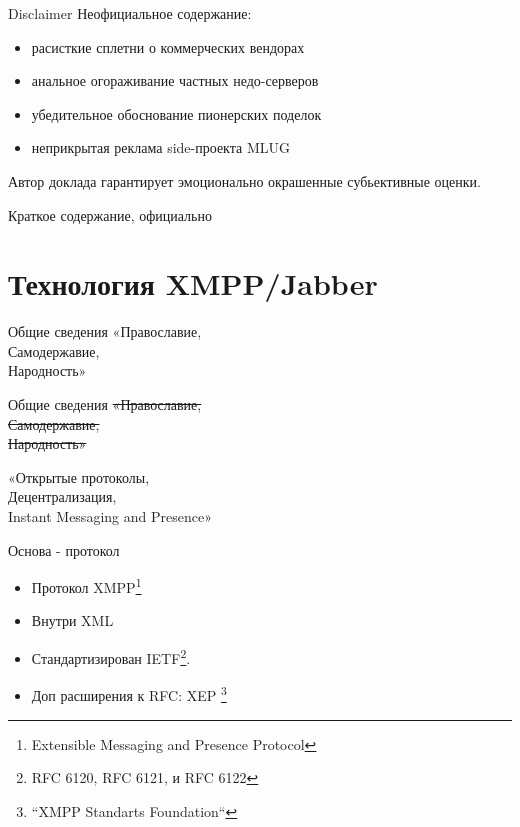 
\begin{frame} 
  \titlepage 
\end{frame} 

\begin{frame}{Disclaimer}
  \Large{Неофициальное содержание:}
  \begin{itemize}
    \item \normalsize{расисткие сплетни о коммерческих вендорах}
    \item анальное огораживание частных недо-серверов 
    \item убедительное обоснование пионерских поделок
    \item неприкрытая реклама side-проекта MLUG
  \end{itemize}


  \emph{ }\newline \pause

  Автор доклада гарантирует эмоционально окрашенные субьективные оценки.
\end{frame}

\begin{frame}{Краткое содержание, официально}
  \tableofcontents
\end{frame}

\section{Технология XMPP/Jabber}

\begin{frame}{Общие сведения}
  \Large{«Православие,\\Самодержавие,\\Народность»} 
\end{frame}

\begin{frame}{Общие сведения}
  \Large{ \sout{«Православие,\\Самодержавие,\\Народность»} }

  «Открытые протоколы,\\ Децентрализация,\\Instant Messaging and Presence»

\end{frame}

\begin{frame}{Основа - протокол}
  \begin{itemize}
    \item Протокол XMPP\footnote{Extensible Messaging and Presence Protocol}

    \item Внутри XML

    \item Стандартизирован IETF\footnote{RFC 6120, RFC 6121, и RFC 6122}.

    \item Доп расширения к RFC: XEP \footnote{ ``XMPP Standarts Foundation``}
  \end{itemize}

\end{frame}

